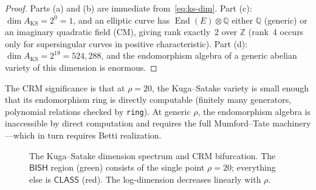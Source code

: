 \documentclass[11pt,a4paper]{article}
\theoremstyle{plain}
\theoremstyle{definition}
\newcommand{\BISH}{\textsf{BISH}}
\newcommand{\CLASS}{\textsf{CLASS}}
\newcommand{\Z}{\mathbb{Z}}
\newcommand{\Q}{\mathbb{Q}}
\DeclareMathOperator{\End}{End}
\begin{document}
\begin{proof}
Parts (a) and (b) are immediate from~\eqref{eq:ks-dim}. Part (c): $\dim A_{\mathrm{KS}} = 2^0 = 1$, and an elliptic curve has $\End(E) \otimes \Q$ either $\Q$ (generic) or an imaginary quadratic field (CM), giving rank exactly~2 over $\Z$ (rank~4 occurs only for supersingular curves in positive characteristic). Part (d): $\dim A_{\mathrm{KS}} = 2^{19} = 524{,}288$, and the endomorphism algebra of a generic abelian variety of this dimension is enormous.
\end{proof}

The CRM significance is that at $\rho = 20$, the Kuga--Satake variety is small enough that its endomorphism ring is directly computable (finitely many generators, polynomial relations checked by \texttt{ring}). At generic $\rho$, the endomorphism algebra is inaccessible by direct computation and requires the full Mumford--Tate machinery---which in turn requires Betti realization.

\begin{figure}[h]
\centering
{}
\caption{The Kuga--Satake dimension spectrum and CRM bifurcation. The $\BISH$ region (green) consists of the single point $\rho = 20$; everything else is $\CLASS$ (red). The log-dimension decreases linearly with $\rho$.}
\label{fig:ks-spectrum}
\end{figure}
\end{document}
